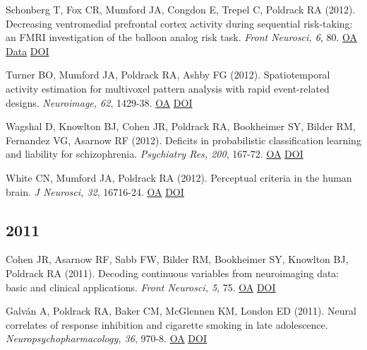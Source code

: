 \documentclass[10pt, letterpaper]{article}
\begin{document}
Schonberg T, Fox CR, Mumford JA, Congdon E, Trepel C, Poldrack RA (2012). Decreasing ventromedial prefrontal cortex activity during sequential risk-taking: an FMRI investigation of the balloon analog risk task. \textit{Front Neurosci, 6}, 80. \href{https://www.ncbi.nlm.nih.gov/pmc/articles/PMC3366349}{OA} \href{https://openneuro.org/datasets/ds000001/versions/1.0.0}{Data} \href{http://dx.doi.org/10.3389/fnins.2012.00080}{DOI} \vspace{2mm}

Turner BO, Mumford JA, Poldrack RA, Ashby FG (2012). Spatiotemporal activity estimation for multivoxel pattern analysis with rapid event-related designs. \textit{Neuroimage, 62}, 1429-38. \href{https://www.ncbi.nlm.nih.gov/pmc/articles/PMC3408801}{OA} \href{http://dx.doi.org/10.1016/j.neuroimage.2012.05.057}{DOI} \vspace{2mm}

Wagshal D, Knowlton BJ, Cohen JR, Poldrack RA, Bookheimer SY, Bilder RM, Fernandez VG, Asarnow RF (2012). Deficits in probabilistic classification learning and liability for schizophrenia. \textit{Psychiatry Res, 200}, 167-72. \href{https://www.ncbi.nlm.nih.gov/pmc/articles/PMC5332149}{OA} \href{http://dx.doi.org/10.1016/j.psychres.2012.06.009}{DOI} \vspace{2mm}

White CN, Mumford JA, Poldrack RA (2012). Perceptual criteria in the human brain. \textit{J Neurosci, 32}, 16716-24. \href{https://www.ncbi.nlm.nih.gov/pmc/articles/PMC6621768}{OA} \href{http://dx.doi.org/10.1523/jneurosci.1744-12.2012}{DOI} \vspace{2mm}

\subsection*{2011}Cohen JR, Asarnow RF, Sabb FW, Bilder RM, Bookheimer SY, Knowlton BJ, Poldrack RA (2011). Decoding continuous variables from neuroimaging data: basic and clinical applications. \textit{Front Neurosci, 5}, 75. \href{https://www.ncbi.nlm.nih.gov/pmc/articles/PMC3118657}{OA} \href{http://dx.doi.org/10.3389/fnins.2011.00075}{DOI} \vspace{2mm}

Galván A, Poldrack RA, Baker CM, McGlennen KM, London ED (2011). Neural correlates of response inhibition and cigarette smoking in late adolescence. \textit{Neuropsychopharmacology, 36}, 970-8. \href{https://www.ncbi.nlm.nih.gov/pmc/articles/PMC3077266}{OA} \href{http://dx.doi.org/10.1038/npp.2010.235}{DOI} \vspace{2mm}
\end{document}

